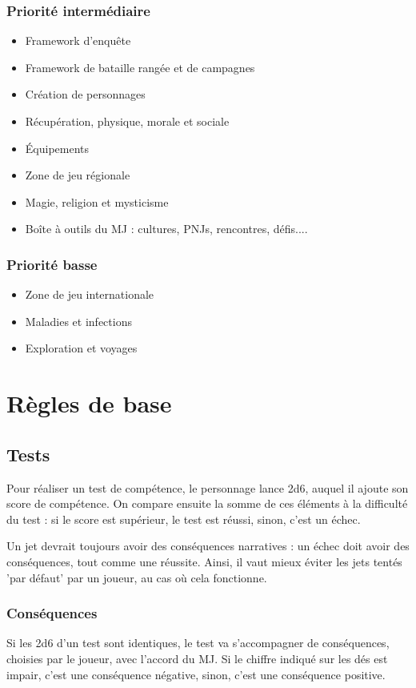 \documentclass[10pt,a4paper]{book}
\begin{document}
\subsection*{Priorité intermédiaire}
\begin{itemize}
\item Framework d'enquête
\item Framework de bataille rangée et de campagnes
\item Création de personnages
\item Récupération, physique, morale et sociale
\item Équipements
\item Zone de jeu régionale
\item Magie, religion et mysticisme
\item Boîte à outils du MJ : cultures, PNJs, rencontres, défis....
\end{itemize}
\subsection*{Priorité basse}
\begin{itemize}
\item Zone de jeu internationale
\item Maladies et infections
\item Exploration et voyages
\end{itemize}
\chapter{Règles de base}
\section{Tests}
Pour réaliser un test de compétence, le personnage lance 2d6, auquel il ajoute son score de compétence. On compare ensuite la somme de ces éléments à la difficulté du test : si le score est supérieur, le test est réussi, sinon, c'est un échec.

Un jet devrait toujours avoir des conséquences narratives : un échec doit avoir des conséquences, tout comme une réussite. Ainsi, il vaut mieux éviter les jets tentés 'par défaut' par un joueur, au cas où cela fonctionne.

\subsection{Conséquences}
Si les 2d6 d'un test sont identiques, le test va s'accompagner de conséquences, choisies par le joueur, avec l'accord du MJ. Si le chiffre indiqué sur les dés est impair, c'est une conséquence négative, sinon, c'est une conséquence positive.
\end{document}
